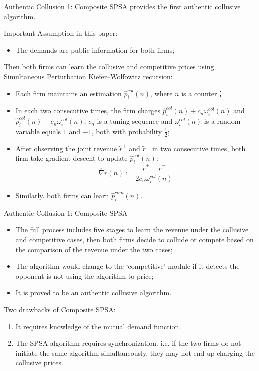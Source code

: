 \documentclass[8pt]{beamer}
\begin{document}
\begin{frame}{Authentic Collusion 1: Composite SPSA}
    \cite{meylahn2022learning} provides the first authentic collusive algorithm. 
    
    Important Assumption in this paper:
    \begin{itemize}
        \item The demands are public information for both firms;
    \end{itemize}
    Then both firms can learn the collusive and competitive prices using Simultaneous Perturbation Kiefer–Wolfowitz recursion:
    \begin{itemize}
        \item Each firm maintains an estimation $\hat{p}_i^{col}(n)$, where $n$ is a counter；
        \item In each two consecutive times, the firm charges $\hat{p}_i^{col}(n)+c_n \omega_i^{col}(n)$ and $\hat{p}_i^{col}(n)-c_n \omega_i^{col}(n)$, $c_n$ is a tuning sequence and $\omega_i^{col}(n)$ is a random variable equals $1$ and $-1$, both with probability $\frac{1}{2}$;
        \item After observing the joint revenue $\tilde{r}^+$ and $\tilde{r}^-$ in two consecutive times, both firm take gradient descent to update $\hat{p}_i^{col}(n)$:
        \[  
            \hat{\nabla}r(n):=\frac{\tilde{r}^+ - \tilde{r}^-}{2c_{n}\omega_{i}^{col}(n)}
        \]
        \item Similarly. both firms can learn $\hat{p}_i^{com}(n)$.
    \end{itemize}
\end{frame}

\begin{frame}{Authentic Collusion 1: Composite SPSA}
    \begin{itemize}
        \item The full process includes five stages to learn the revenue under the collusive and competitive cases, then both firms decide to collude or compete based on the comparison of the revenue under the two cases;
        \item The algorithm would change to the `competitive' module if it detects the opponent is not using the algorithm to price;
        \item It is proved to be an authentic collusive algorithm.
    \end{itemize}
    \vspace{0.5cm}
    Two drawbacks of Composite SPSA:
    \begin{enumerate}
        \item It requires knowledge of the mutual demand function.
        \item The SPSA algorithm requires synchronization. i.e. if the two firms do not initiate the same algorithm simultaneously, they may not end up charging the collusive prices.
    \end{enumerate}
\end{frame}
\end{document}
